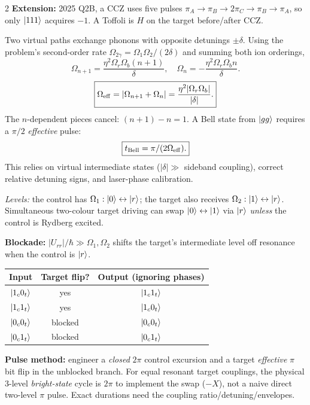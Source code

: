 \begin{multicols}{2}
\textbf{Extension:} 2025 Q2B, a CCZ uses five pulses $\pi_A\to\pi_B\to2\pi_C\to\pi_B\to\pi_A$, so only $\left\lvert 111\right\rangle$ acquires $-1$. A Toffoli is $H$ on the target before/after CCZ.

Two virtual paths exchange phonons with opposite detunings $\pm\delta$. Using the problem's second-order rate $\Omega_{2\gamma}=\Omega_1\Omega_2/(2\delta)$ and summing both ion orderings,
\[\Omega_{n+1}=\frac{\eta^2\Omega_r\Omega_b(n+1)}{\delta},\quad
\Omega_{n}=-\frac{\eta^2\Omega_r\Omega_b n}{\delta}.\]
\[\boxed{\Omega_{\rm eff}=|\Omega_{n+1}+\Omega_n|=\frac{\eta^2|\Omega_r\Omega_b|}{|\delta|}.}\]
The $n$-dependent pieces cancel: $(n+1)-n=1$. A Bell state from $\left\lvert gg\right\rangle$ requires a $\pi/2$ \emph{effective} pulse:
\[\boxed{t_{\rm Bell}=\pi/(2\Omega_{\rm eff}).}\]
This relies on virtual intermediate states ($|\delta|\gg$ sideband coupling), correct relative detuning signs, and laser-phase calibration.

\columnbreak
{}
\emph{Levels:} the control has $\Omega_1:\left\lvert 0\right\rangle\leftrightarrow\left\lvert r\right\rangle$; the target also receives $\Omega_2:\left\lvert 1\right\rangle\leftrightarrow\left\lvert r\right\rangle$. Simultaneous two-colour target driving can swap $\left\lvert 0\right\rangle\leftrightarrow\left\lvert 1\right\rangle$ via $\left\lvert r\right\rangle$ \emph{unless} the control is Rydberg excited.

\begin{center}
\end{center}
\textbf{Blockade:} $|U_{rr}|/\hbar\gg\Omega_1,\Omega_2$ shifts the target's intermediate level off resonance when the control is $\left\lvert r\right\rangle$.

\begin{center}\footnotesize
\begin{tabular}{@{}ccc@{}}\toprule
Input&Target flip?&Output (ignoring phases)\\\midrule
$\left\lvert 1_c0_t\right\rangle$&yes&$\left\lvert 1_c1_t\right\rangle$\\
$\left\lvert 1_c1_t\right\rangle$&yes&$\left\lvert 1_c0_t\right\rangle$\\
$\left\lvert 0_c0_t\right\rangle$&blocked&$\left\lvert 0_c0_t\right\rangle$\\
$\left\lvert 0_c1_t\right\rangle$&blocked&$\left\lvert 0_c1_t\right\rangle$\\
\bottomrule\end{tabular}
\end{center}
\textbf{Pulse method:} engineer a \emph{closed} $2\pi$ control excursion and a target \emph{effective} $\pi$ bit flip in the unblocked branch. For equal resonant target couplings, the physical 3-level \emph{bright-state} cycle is $2\pi$ to implement the swap ($-X$), not a naive direct two-level $\pi$ pulse. Exact durations need the coupling ratio/detuning/envelopes.


\end{multicols}
